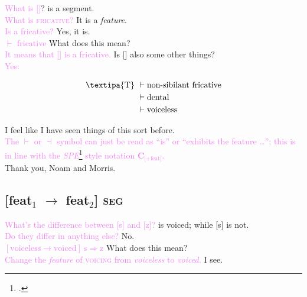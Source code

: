 \documentclass{report}[12pt]
\begin{document}
\begin{tcolorbox}
  \textcolor{violet}{What is []}? \quad [\textipa{T}] is a segment. \\
  \textcolor{violet}{What is \textsc{fricative}?} \quad It is a \emph{feature}. \\
  \textcolor{violet}{Is  a fricative?} \quad Yes, it is. \\
  \textcolor{violet}{ $\vdash$ fricative} \quad What does this mean? \\
  \textcolor{violet}{It means that [] is a fricative.} \quad Is [] also some other things? \\  
  \textcolor{violet}{Yes:}
  \begin{tcolorbox}
    \begin{align*}
      \text{\textipa{T}}\ & \vdash \text{non-sibilant fricative} \\
                          & \vdash \text{dental} \\
                          & \vdash \text{voiceless} 
    \end{align*}
  \end{tcolorbox}
  I feel like I have seen things of this sort before. \\
  \textcolor{violet}{The $\vdash$ or $\dashv$ symbol can just be read as ``is'' or ``exhibits the feature \dots''; this is in line with the \emph{SPE}\footcite{spe} style notation $\textbf{C}_{\text{[+feat]}}$.} \\ 
  Thank you, Noam and Morris. \\
\end{tcolorbox}

\subsection*{[feat$_1$ $\rightarrow$ feat$_2$] \textsc{seg}}

\begin{tcolorbox}
  \textcolor{violet}{What's the difference between [s] and [z]?} \quad [z] is voiced; while [s] is not. \\
  \textcolor{violet}{Do they differ in anything else?} \quad No. \\
  \textcolor{violet}{$[\text{voiceless} \rightarrow \text{voiced}]\ \text{s} \Rightarrow \text{z}$} \quad What does this mean? \\
  \textcolor{violet}{Change the \emph{feature} of \textsc{voicing} from \emph{voiceless} to \emph{voiced.}} \quad I see. \\  
\end{tcolorbox}
\end{document}

